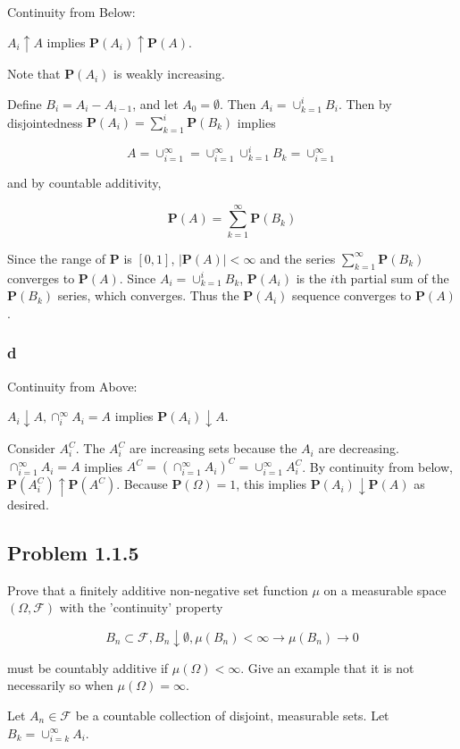 \documentclass{article}
\newcommand{\F}{\mathcal{F}}
\newcommand{\prob}{\boldsymbol{P}}
\begin{document}
Continuity from Below:

$A_i \uparrow A$ implies $\prob(A_i) \uparrow \prob(A)$.

Note that $\prob(A_i)$ is weakly increasing.

Define $B_i = A_i - A_{i-1}$, and let $A_0 = \emptyset$. Then $A_i = \cup_{k=1}^i B_i$. Then by disjointedness $\prob(A_i) = \sum_{k=1}^i \prob(B_k)$ implies

\[
A = \cup_{i=1}^\infty = \cup_{i=1}^\infty \cup_{k=1}^i B_k = \cup_{i=1}^\infty
\]

and by countable additivity,

\[
\prob(A) = \sum_{k=1}^\infty \prob(B_k)
\]

Since the range of $\prob$ is $[0, 1]$, $|\prob(A)| < \infty$ and the series $\sum_{k=1}^\infty \prob(B_k)$ converges to $\prob(A)$. Since $A_i = \cup_{k=1}^i B_k$, $\prob(A_i)$ is the $i$th partial sum of the $\prob(B_k)$ series, which converges. Thus the $\prob(A_i)$ sequence converges to $\prob(A)$.

\subsubsection*{d}

Continuity from Above:

$A_i \downarrow A, \cap_i^\infty A_i = A$ implies $\prob(A_i) \downarrow A$.

Consider $A_i^C$. The $A_i^C$ are increasing sets because the $A_i$ are decreasing. $\cap_{i=1}^\infty A_i = A$ implies $A^C = (\cap_{i=1}^\infty A_i)^C = \cup_{i=1}^\infty A_i^C$. By continuity from below, $\prob(A_i^C) \uparrow \prob(A^C)$. Because $\prob(\Omega) = 1$, this implies $\prob(A_i) \downarrow \prob(A)$ as desired. 

\subsection*{Problem 1.1.5}

Prove that a finitely additive non-negative set function $\mu$ on a measurable space $(\Omega, \F)$ with the 'continuity' property

\[
B_n \subset \F, B_n \downarrow \emptyset, \mu(B_n) < \infty \longrightarrow \mu(B_n) \rightarrow 0
\]

must be countably additive if $\mu(\Omega) < \infty$. Give an example that it is not necessarily so when $\mu(\Omega) = \infty$.

Let $A_n \in \F$ be a countable collection of disjoint, measurable sets. Let $B_k = \cup_{i=k}^\infty A_i$.
\end{document}
